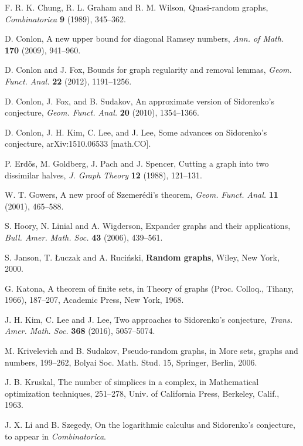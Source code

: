 \documentclass[11pt]{article}
\begin{document}
\begin{thebibliography}{}

F. R. K. Chung, R. L. Graham and R. M. Wilson, Quasi-random graphs, {\it
Combinatorica} {\bf 9} (1989), 345--362.

D. Conlon, A new upper bound for diagonal Ramsey numbers, {\it Ann. of Math.} {\bf 170} (2009), 941--960.

D. Conlon and J. Fox, Bounds for graph regularity and removal lemmas, {\it Geom. Funct. Anal.} {\bf 22} (2012), 1191--1256.

D. Conlon, J. Fox, and B. Sudakov, An approximate version of Sidorenko's conjecture, \emph{Geom. Funct. Anal.} \textbf{20} (2010), 1354--1366.

{D. Conlon, J. H. Kim, C. Lee, and J. Lee,} {Some advances on Sidorenko's conjecture,} arXiv:1510.06533 [math.CO].

P. Erd\H{o}s, M. Goldberg, J. Pach and J. Spencer, 
Cutting a graph into two dissimilar halves, {\em J. Graph Theory} {\bf 12} (1988), 121--131.

{W. T. Gowers,} {A new proof of Szemer\'edi's theorem,} {\it Geom. Funct. Anal.} {\bf 11} (2001), 465--588.

{S. Hoory, N. Linial and A. Wigderson,} Expander graphs and their applications, {\it Bull. Amer. Math. Soc.} {\bf 43} (2006), 439--561. 

{S. Janson, T. \L uczak and A. Ruci\'nski,} {\bf Random graphs}, Wiley, New York, 2000.

{G. Katona,} {A theorem of finite sets,} in Theory of graphs (Proc. Colloq., Tihany, 1966), 187--207, Academic Press, New York, 1968.

{J. H. Kim, C. Lee and J. Lee,} Two approaches to Sidorenko's conjecture, {\it Trans. Amer. Math. Soc.} {\bf 368} (2016), 5057--5074.

M. Krivelevich and B. Sudakov, Pseudo-random graphs, in {More sets, graphs and
numbers,} 199--262, Bolyai Soc. Math. Stud. 15, Springer, Berlin, 2006.

{J. B. Kruskal,} {The number of simplices in a complex,} in Mathematical optimization techniques, 251--278, Univ. of California Press, Berkeley, Calif., 1963.

J. X. Li and B. Szegedy, On the logarithmic calculus and Sidorenko's conjecture, to appear in \emph{Combinatorica}.


\end{thebibliography}
\end{document}
